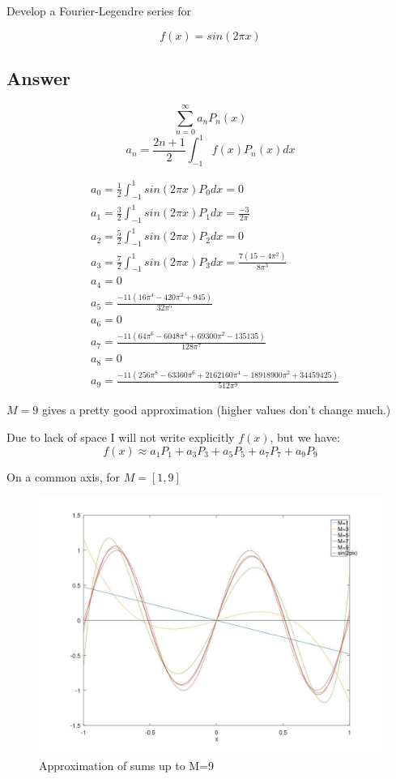 \documentclass{article}
\begin{document}
Develop a Fourier-Legendre series for

\begin{equation}\label{39A}
f(x) = sin(2\pi x)
\end{equation}
\subsection*{Answer}
$$ \sum_{n=0}^{\infty} a_n P_n (x) $$
$$ a_n = \frac{2n+1}{2} \int_{-1}^{1} f(x) P_n(x) dx $$

\begin{align*}
&a_0 = \frac{1}{2} \int_{-1}^{1} sin(2\pi x) P_0 dx = 0 \\
&a_1 = \frac{3}{2} \int_{-1}^{1} sin(2\pi x) P_1 dx = \frac{-3}{2\pi} \\
&a_2 = \frac{5}{2} \int_{-1}^{1} sin(2\pi x) P_2 dx = 0\\
&a_3 = \frac{7}{2} \int_{-1}^{1} sin(2\pi x) P_3 dx = \frac{7(15-4\pi^2)}{8\pi^3} \\
&a_4 = 0\\
&a_5 = \frac{-11(16\pi^4-420\pi^2+945)}{32\pi^5}\\
&a_6 = 0\\
&a_7 = \frac{-11(64\pi^6-6048\pi^4+69300\pi^2-135135)}{128\pi^7}\\
&a_8 = 0\\
&a_9 = \frac{-11(256\pi^8-63360\pi^6+2162160\pi^4-18918900\pi^2+34459425)}{512\pi^9}
\end{align*}

$M=9$ gives a pretty good approximation (higher values don't change much.)

Due to lack of space I will not write explicitly $f(x)$, but we have:
$$ f(x) \approx a_1 P_1 + a_3 P_3 + a_5 P_5 + a_7  P_7 + a_9 P_9 $$

On a common axis, for $M = [1,9]$
\begin{figure}
\centering
\includegraphics[width=1.0\textwidth]{./static/out.jpg}
\caption{Approximation of sums up to M=9}
\end{figure}
\end{document}

